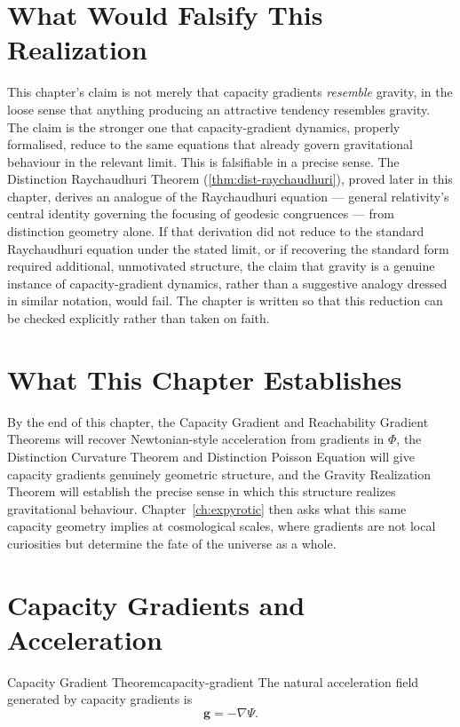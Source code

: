 \documentclass[12pt,twoside,openright]{book}
\begin{document}
\section{What Would Falsify This Realization}
\label{sec:ch17-falsifiability}

This chapter's claim is not merely that capacity gradients
\emph{resemble} gravity, in the loose sense that anything
producing an attractive tendency resembles gravity. The claim
is the stronger one that capacity-gradient dynamics, properly
formalised, reduce to the same equations that already govern
gravitational behaviour in the relevant limit. This is
falsifiable in a precise sense. The Distinction Raychaudhuri
Theorem (\cref{thm:dist-raychaudhuri}), proved later in this
chapter, derives an analogue of the Raychaudhuri equation ---
general relativity's central identity governing the focusing
of geodesic congruences --- from distinction geometry alone.
If that derivation did not reduce to the standard Raychaudhuri
equation under the stated limit, or if recovering the standard
form required additional, unmotivated structure, the claim
that gravity is a genuine instance of capacity-gradient
dynamics, rather than a suggestive analogy dressed in similar
notation, would fail. The chapter is written so that this
reduction can be checked explicitly rather than taken on
faith.

\section{What This Chapter Establishes}
\label{sec:ch17-preview}

By the end of this chapter, the Capacity Gradient and
Reachability Gradient Theorems will recover Newtonian-style
acceleration from gradients in $\Phi$, the Distinction
Curvature Theorem and Distinction Poisson Equation will give
capacity gradients genuinely geometric structure, and the
Gravity Realization Theorem will establish the precise sense
in which this structure realizes gravitational behaviour.
Chapter~\ref{ch:expyrotic} then asks what this same capacity
geometry implies at cosmological scales, where gradients are
not local curiosities but determine the fate of the universe
as a whole.

\section{Capacity Gradients and Acceleration}
\label{sec:ch17-gradient}

\begin{theorem}{Capacity Gradient Theorem}{capacity-gradient}
  The natural acceleration field generated by capacity
  gradients is
  \[
    \mathbf{g} = -\nabla\Psi.
  \]
\end{theorem}
\end{document}
